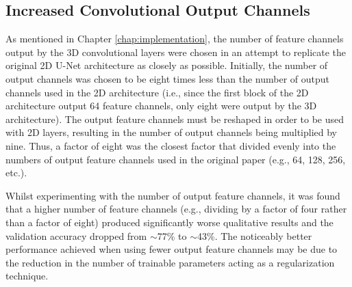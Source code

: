 \subsection{Increased Convolutional Output Channels}

As mentioned in Chapter \ref{chap:implementation}, the number of feature channels output by the 3D convolutional layers were chosen in an attempt to replicate the original 2D U-Net architecture as closely as possible. Initially, the number of output channels was chosen to be eight times less than the number of output channels used in the 2D architecture (i.e., since the first block of the 2D architecture output 64 feature channels, only eight were output by the 3D architecture). The output feature channels must be reshaped in order to be used with 2D layers, resulting in the number of output channels being multiplied by nine. Thus, a factor of eight was the closest factor that divided evenly into the numbers of output feature channels used in the original paper (e.g., 64, 128, 256, etc.).

Whilst experimenting with the number of output feature channels, it was found that a higher number of feature channels (e.g., dividing by a factor of four rather than a factor of eight) produced significantly worse qualitative results and the validation accuracy dropped from ${\sim}$77\% to ${\sim}$43\%. The noticeably better performance achieved when using fewer output feature channels may be due to the reduction in the number of trainable parameters acting as a regularization technique.




